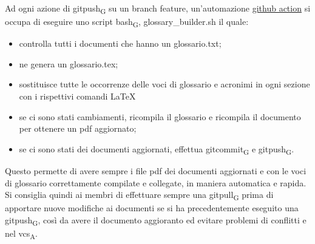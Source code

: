                 Ad ogni azione di \gls{gitpush}\textsubscript{G} su un branch feature, un'automazione \href{https://docs.github.com/en/free-pro-team@latest/actions}{github action} si occupa di eseguire uno script \gls{bash}\textsubscript{G}, glossary\_builder.sh il quale:
                \begin{itemize}
                    \item controlla tutti i documenti che hanno un glossario.txt;
                    \item ne genera un glossario.tex;
                    \item sostituisce tutte le occorrenze delle voci di glossario e acronimi in ogni sezione con i rispettivi comandi \LaTeX{}
                    \item se ci sono stati cambiamenti, ricompila il glossario e ricompila il documento per ottenere un pdf aggiornato;
                    \item se ci sono stati dei documenti aggiornati, effettua \gls{gitcommit}\textsubscript{G} e \gls{gitpush}\textsubscript{G}.
                \end{itemize}
                Questo permette di avere sempre i file pdf dei documenti aggiornati e con le voci di glossario correttamente compilate e collegate, in maniera automatica e rapida. Si consiglia quindi ai membri di effettuare sempre una \gls{gitpull}\textsubscript{G} prima di apportare nuove modifiche ai documenti se si ha precedentemente eseguito una \gls{gitpush}\textsubscript{G}, così da avere il documento aggioranto ed evitare problemi di conflitti e nel \acrshort{vcs}\textsubscript{A}.
